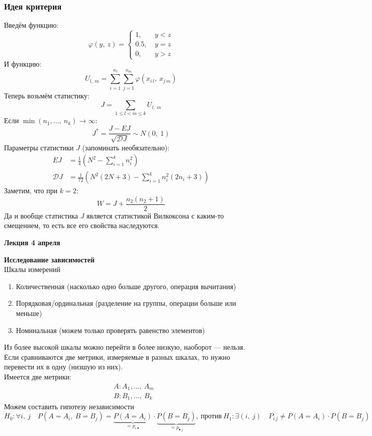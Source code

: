 \documentclass[12pt, a4paper]{article}
\newcommand{\dev}{\mathcal{D}}
\begin{document}
\subsubsection*{Идея критерия}
Введём функцию:
\[\varphi(y,\ z) = \begin{cases}
    1,\ &y < z\\
    0.5,\ & y = z\\
    0,\ & y > z
\end{cases}\]
И функцию:
\[U_{l,\ m} = \sum_{i = 1}^{n_l} \sum_{j = 1}^{n_m} \varphi(x_{i\, l},\ x_{j\, m})\]
Теперь возьмём статистику:
\[ J = \sum_{1 \leq l < m \leq k} U_{l,\ m} \]
Если $\min (n_1,\dots,\ n_k) \to \infty$:
\[ J^* = \frac{J - EJ}{\sqrt{\dev J}} \sim N(0,\ 1)\]
Параметры статистики $J$ (запоминать необязательно):
\begin{equation*}
    \begin{aligned}
        EJ &= \frac{1}{4}{\left( N^2 - \sum_{i = 1}^{k} n_i^2 \right)}\\
        \dev J &= \frac{1}{72} {\left( N^2 \left( 2N + 3 \right) - \sum_{i = 1}^{k} n_i^2 (2n_i + 3) \right)}
    \end{aligned}
\end{equation*}
Заметим, что при $k = 2$:
\[W = J + \frac{n_2(n_2 + 1)}{2}\]
Да и вообще статистика $J$ является статистикой Вилкоксона с каким-то смещением, то есть все его свойства наследуются.
\begin{center}
    \bf Лекция 4 апреля
\end{center}
\begin{center}
{\Large\textbf{Исследование зависимостей}}\\
Шкалы измерений
\end{center}
\begin{enumerate}
    \item Количественная (насколько одно больше другого, операция вычитания)
    \item Порядковая/ординальная (разделение на группы, операции больше или меньше)
    \item Номинальная (можем только проверять равенство элементов)
\end{enumerate}
Из более высокой шкалы можно перейти в более низкую, наоборот --- нельзя. Если сравниваются две метрики, измеряемые в разных шкалах, то нужно перевести их в одну (низшую из них).\\
Имеется две метрики:
\begin{equation*}
    \begin{aligned}
        & A: A_1,\dots,\ A_m\\
        & B: B_1,\dots,\ B_k
    \end{aligned}
\end{equation*}
Можем составить гипотезу независимости
\[H_0: \forall i,\ j\quad P(A = A_i,\ B = B_j) = \underset{=p_{i\, \bullet}}{\underbrace{P(A = A_i)}} \cdot \underset{=p_{\bullet\, j}}{\underbrace{P (B = B_j)}},\ \text{против}\ H_1: \exists (i,\ j)\quad P_{i\, j} \neq P(A = A_i) \cdot P(B = B_j)\]
\end{document}
